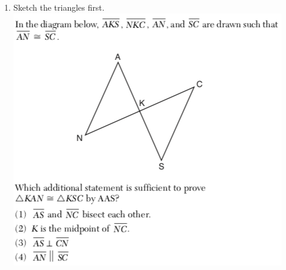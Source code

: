 \documentclass[12pt, twoside]{article}
\begin{document}
\begin{enumerate}
\item Sketch the triangles first. \\
      \includegraphics[scale=0.8]{geom-82019-10.png}

\end{enumerate}
\end{document}
